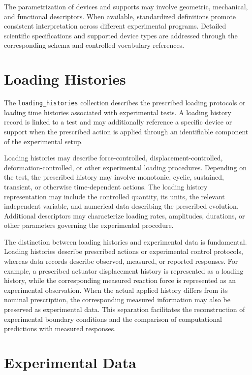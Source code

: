 The parametrization of devices
and supports may involve
geometric, mechanical,
and functional descriptors.
When available, standardized
definitions promote consistent
interpretation across
different experimental programs.
Detailed scientific specifications
and supported device types are
addressed through the
corresponding schema and
controlled vocabulary references.


\section{Loading Histories}

The \texttt{loading\_histories}
collection describes the
prescribed loading protocols
or loading time histories
associated with experimental
tests.
A loading history record
is linked to a test and
may additionally reference
a specific device or support
when the prescribed action
is applied through an
identifiable component
of the experimental setup.

Loading histories may
describe force-controlled,
displacement-controlled,
deformation-controlled,
or other experimental
loading procedures.
Depending on the test,
the prescribed history
may involve monotonic,
cyclic, sustained,
transient, or otherwise
time-dependent actions.
The loading history
representation may include
the controlled quantity,
its units, the relevant
independent variable,
and numerical data
describing the prescribed
evolution.
Additional descriptors
may characterize loading
rates, amplitudes,
durations, or other
parameters governing
the experimental procedure.

The distinction between
loading histories and
experimental data is
fundamental.
Loading histories
describe prescribed
actions or experimental
control protocols,
whereas data records
describe observed,
measured, or reported
responses.
For example, a prescribed
actuator displacement
history is represented
as a loading history,
while the corresponding
measured reaction force
is represented as an
experimental observation.
When the actual applied
history differs from
its nominal prescription,
the corresponding measured
information may also
be preserved as
experimental data.
This separation facilitates
the reconstruction of
experimental boundary
conditions and the
comparison of computational
predictions with measured
responses.


\section{Experimental Data}

